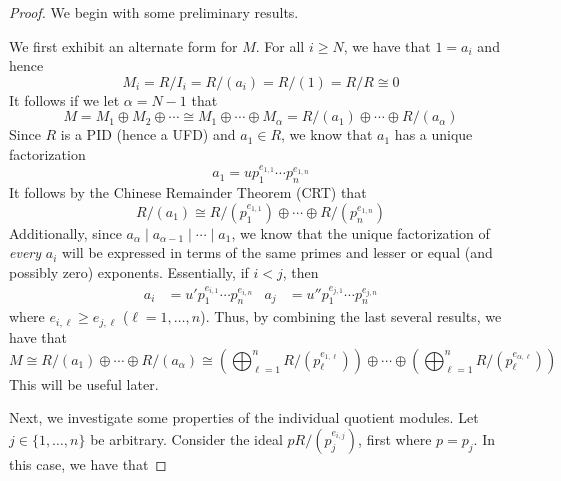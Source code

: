 \documentclass[../psets.tex]{subfiles}
\begin{document}
\begin{enumerate}
\begin{enumerate}
\begin{proof}
            We begin with some preliminary results.\par\smallskip
            We first exhibit an alternate form for $M$. For all $i\geq N$, we have that $1=a_i$ and hence
            \begin{equation*}
                M_i = R/I_i = R/(a_i) = R/(1) = R/R \cong 0
            \end{equation*}
            It follows if we let $\alpha=N-1$ that
            \begin{equation*}
                M = M_1\oplus M_2\oplus\cdots
                \cong M_1\oplus\cdots\oplus M_\alpha
                = R/(a_1)\oplus\cdots\oplus R/(a_\alpha)
            \end{equation*}
            Since $R$ is a PID (hence a UFD) and $a_1\in R$, we know that $a_1$ has a unique factorization
            \begin{equation*}
                a_1 = up_1^{e_{1,1}}\cdots p_n^{e_{1,n}}
            \end{equation*}
            It follows by the Chinese Remainder Theorem (CRT) that
            \begin{equation*}
                R/(a_1) \cong R/(p_1^{e_{1,1}})\oplus\cdots\oplus R/(p_n^{e_{1,n}})
            \end{equation*}
            Additionally, since $a_\alpha\mid a_{\alpha-1}\mid\cdots\mid a_1$, we know that the unique factorization of \emph{every} $a_i$ will be expressed in terms of the same primes and lesser or equal (and possibly zero) exponents. Essentially, if $i<j$, then
            \begin{align*}
                a_i &= u'p_1^{e_{i,1}}\cdots p_n^{e_{i,n}}&
                a_j &= u''p_1^{e_{j,1}}\cdots p_n^{e_{j,n}}
            \end{align*}
            where $e_{i,\ell}\geq e_{j,\ell}$ ($\ell=1,\dots,n$). Thus, by combining the last several results, we have that
            \begin{equation*}
                M \cong R/(a_1)\oplus\cdots\oplus R/(a_\alpha)
                \cong \left( \bigoplus_{\ell=1}^nR/(p_\ell^{e_{1,\ell}}) \right)\oplus\cdots\oplus\left( \bigoplus_{\ell=1}^nR/(p_\ell^{e_{\alpha,\ell}}) \right)
            \end{equation*}
            This will be useful later.\par
            Next, we investigate some properties of the individual quotient modules. Let $j\in\{1,\dots,n\}$ be arbitrary. Consider the ideal $pR/(p_j^{e_{i,j}})$, first where $p=p_j$. In this case, we have that

\end{proof}
\end{enumerate}
\end{enumerate}
\end{document}
